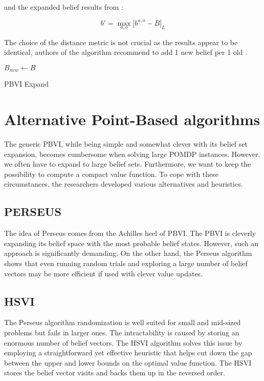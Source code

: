and the expanded belief results from :

\begin{equation}b' = \operatorname*{max}_{a, o} |b^{a, o} - B|_L\end{equation}

The choice of the distance metric is not crucial as the results appear to be identical, authors of the algorithm recommend to add 1 new belief per 1 old \cite{pbvi}.


\LinesNumbered
\begin{algorithm}[H]
\SetAlgoLined
$B_{new} \xleftarrow{} B$ 
\caption{PBVI Expand}
\end{algorithm}



\section{Alternative Point-Based algorithms}

The generic PBVI, while being simple and somewhat clever with its belief set expansion, becomes cumbersome when solving large POMDP instances. However, we often have to expand to large belief sets. Furthermore, we want to keep the possibility to compute a compact value function. To cope with these circumstances, the researchers developed various alternatives and heuristics.


\subsection{PERSEUS \cite{perseus}}

The idea of Perseus comes from the Achilles heel of PBVI. The PBVI is cleverly expanding its belief space with the most probable belief states. However, such an approach is significantly demanding. On the other hand, the Perseus algorithm shows that even running random trials and exploring a large number of belief vectors may be more efficient if used with clever value updates.


\subsection{HSVI \cite{hsvi}}
The Perseus algorithm randomization is well suited for small and mid-sized problems but fails in larger ones. The intractability is caused by storing an enormous number of belief vectors. The HSVI algorithm solves this issue by employing a straightforward yet effective heuristic that helps cut down the gap between the upper and lower bounds on the optimal value function. The HSVI stores the belief vector visits and backs them up in the reversed order.


